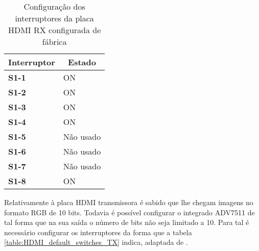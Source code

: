\begin{table}[h!]
	\centering

		\begin{tabular}{@{}l|l@{}}
			\toprule
			\multicolumn{1}{c}{\textbf{Interruptor}} & \multicolumn{1}{c}{\textbf{Estado}} \\ \midrule
			\textbf{S1-1}                            & ON                                  \\
			\textbf{S1-2}                            & ON                                  \\
			\textbf{S1-3}                            & ON                                  \\
			\textbf{S1-4}                            & ON                                  \\
			\textbf{S1-5}                            & Não usado                           \\
			\textbf{S1-6}                            & Não usado                           \\
			\textbf{S1-7}                            & Não usado                           \\
			\textbf{S1-8}                            & ON                                  \\ \bottomrule
		\end{tabular}%
	\captionsetup{width=0.3\linewidth}
	\caption{Configuração dos interruptores da placa HDMI RX configurada de fábrica}
	\label{table:HDMI_default_switches_RX}
\end{table}

Relativamente à placa HDMI transmissora é sabido que lhe chegam imagens no formato RGB de 10 bits. Todavia é possível configurar o integrado ADV7511 de tal forma que na sua saída o número de bits não seja limitado a 10. Para tal é necessário configurar os interruptores da forma que a tabela \ref{table:HDMI_default_switches_TX} indica, adaptada de \cite{R009}.


